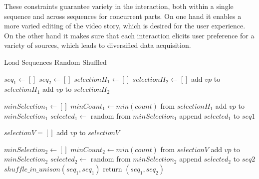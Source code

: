 These constraints guarantee variety in the interaction, both within a single sequence and across sequences for concurrent parts. On one hand it enables a more varied editing of the video story, which is desired for the user experience. On the other hand it makes sure that each interaction elicits user preference for a variety of sources, which leads to diversified data acquisition.

\begin{algorithm}
  \caption{Load Sequences Random Shuffled}
  \begin{algorithmic}[1]
      \State $seq_1 \gets []$
      \State $seq_2 \gets []$
        \State $selectionH_1 \gets []$
        \State $selectionH_2 \gets []$
            \State add $vp$ to $selectionH_1$
          \EndIf
            \State add $vp$ to $selectionH_2$
          \EndIf
        \EndFor
        
        \State $minSelection_1 \gets []$
        \State $minCount_1 \gets min(count)$ from $selectionH_1$
            \State add $vp$ to $minSelection_1$
          \EndIf
        \EndFor
        \State $selected_1 \gets$ random from $minSelection_1$
        \State append $selected_1$ to $seq1$
        
        \State $selectionV = []$
         
            \State add $vp$ to $selectionV$
          \EndIf
        \EndFor
        
        \State $minSelection_2 \gets []$
        \State $minCount_2 \gets min(count)$ from $selectionV$
            \State add $vp$ to $minSelection_2$
          \EndIf
        \EndFor
        \State $selected_2 \gets$ random from $minSelection_2$
        \State append $selected_2$ to $seq2$
      \EndFor
      \State $shuffle\_in\_unison(seq_1, seq_1)$
      \State return $(seq_1, seq_2)$
    \EndProcedure
  \end{algorithmic}
  \label{alg:genseqs}
\end{algorithm}

